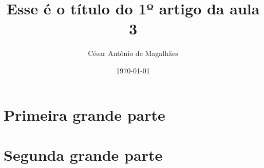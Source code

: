 \documentclass[12pt, a4paper, openany]{book}
\title{Esse é o título do 1º artigo da aula 3}
\author{César Antônio de Magalhães}
\date{\today}
\begin{document}
	\renewcommand{\contentsname}{Índice}
	\tableofcontents
	
	\part{Primeira grande parte}	
			
			
	\part{Segunda grande parte}	
		
							
\end{document}
